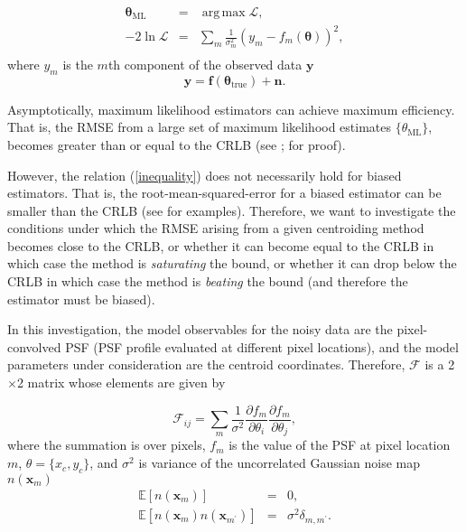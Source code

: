 \documentclass[12pt, preprint]{aastex}
\DeclareMathOperator*{\argmax}{arg\,max}
\newcommand{\beq}{\begin{equation}}
\newcommand{\eeq}{\end{equation}}
\begin{document}
\begin{eqnarray}
\boldsymbol{\mathbf{\theta}}_{\text{ML}} &=& \argmax \mathcal{L}, \\
-2\ln \mathcal{L} &=& \sum_{m}\frac{1}{\sigma_{m}^{2}}( y_{m} - f_{m}(\boldsymbol{\mathbf{\theta}}))^{2}, \\
\end{eqnarray}
where $y_{m}$ is the $m$th component of the observed data $\mathbf{y}$
\beq
\mathbf{y} = \mathbf{f}(\boldsymbol{\mathbf{\theta}}_{\text{true}}) + \mathbf{n}.
\eeq

Asymptotically, maximum likelihood estimators can achieve maximum efficiency. That is, the RMSE from a 
large set of maximum likelihood estimates $\{\theta_{\text{ML}}\}$, 
becomes greater than or equal to the CRLB (see \citealt{cramer}; \citealt{lecam} for proof). 

However, the relation (\ref{inequality}) does not necessarily hold for biased estimators. That is, 
the root-mean-squared-error for a biased estimator can be smaller than the CRLB (see \citealt{lecam} for examples).
Therefore, we want to investigate the conditions under which the RMSE arising from a given centroiding method 
becomes close to the CRLB, or whether it can become equal to the CRLB in which case the method is \emph{saturating} 
the bound, or whether it can drop below the CRLB in which case the method is \emph{beating} the bound (and therefore the estimator must be biased).   
  
In this investigation, the model observables for the noisy data are the pixel-convolved PSF (PSF profile evaluated at different pixel locations), and  
the model parameters under consideration are the centroid coordinates. Therefore, $\mathcal{F}$
is a 2$\times$2 matrix whose elements are given by

\beq
  \mathcal{F}_{ij} = \sum_{m}\frac{1}{\sigma^{2}}
                \frac{\partial f_{m}}{\partial \theta_{i}}\frac{\partial f_{m}}{\partial \theta_{j}},
\label{fish}
\eeq
where the summation is over pixels, $f_{m}$ is the value of the PSF at pixel location $m$,
$\theta=\{x_{c},y_{c}\}$, and $\sigma^{2}$ is variance of the uncorrelated Gaussian noise map $n(\mathbf{x}_{m})$
\begin{eqnarray}
\mathbb{E}[n(\mathbf{x}_{m})] &=& 0, \\
\mathbb{E}[n(\mathbf{x}_{m})n(\mathbf{x}_{m^{\prime}})] &=& \sigma^{2}\delta_{m,m^{\prime}}. 
\end{eqnarray}
\end{document}
